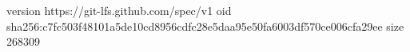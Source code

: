 version https://git-lfs.github.com/spec/v1
oid sha256:c7fc503f48101a5de10cd8956cdfc28e5daa95e50fa6003df570ce006cfa29ee
size 268309
